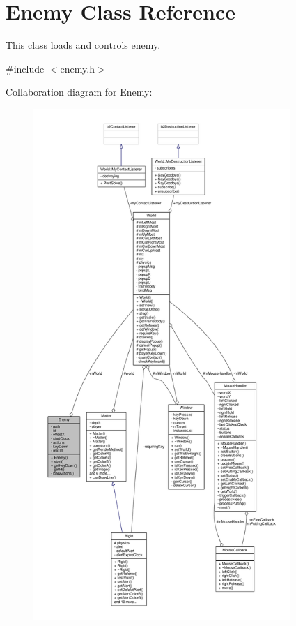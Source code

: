 \hypertarget{classEnemy}{}\section{Enemy Class Reference}
\label{classEnemy}


This class loads and controls enemy.  




{\ttfamily \#include $<$enemy.\+h$>$}



Collaboration diagram for Enemy\+:
\nopagebreak
\begin{figure}[H]
\begin{center}
\leavevmode
\includegraphics[height=550pt]{classEnemy__coll__graph}
\end{center}
\end{figure}

